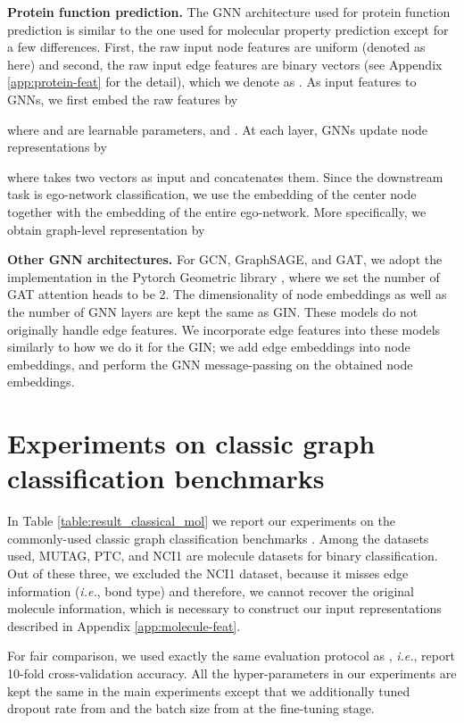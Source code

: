 \documentclass{article} \usepackage{iclr2020_conference,times}
\numberwithin{equation}{section}
\theoremstyle{plain}
\theoremstyle{definition}
\theoremstyle{remark}
\newcommand{\ie}{\textit{i.e.}}
\begin{document}
{\bf Protein function prediction.}
The GNN architecture used for protein function prediction is similar to the one used for molecular property prediction except for a few differences.
First, the raw input node features are uniform (denoted as  here) and second, the raw input edge features are binary vectors (see Appendix \ref{app:protein-feat} for the detail), which we denote as . As input features to GNNs, we first embed the raw features by 

where  and  are learnable parameters, and .
At each layer, GNNs update node representations by


where  takes two vectors as input and concatenates them. Since the downstream task is ego-network classification, we use the embedding of the center node  together with the embedding of the entire ego-network. More specifically, we obtain graph-level representation  by 

{\bf Other GNN architectures.}
For GCN, GraphSAGE, and GAT, we adopt the implementation in the Pytorch Geometric library \citep{fey2019fast}, where we set the number of GAT attention heads to be 2. The dimensionality of node embeddings as well as the number of GNN layers are kept the same as GIN.
These models do not originally handle edge features. 
We incorporate edge features into these models similarly to how we do it for the GIN; we add edge embeddings into node embeddings, and perform the GNN message-passing on the obtained node embeddings.


\section{Experiments on classic graph classification benchmarks}
\label{sec:classical_benchmarks}

In Table \ref{table:result_classical_mol} we report our experiments on the commonly-used classic graph classification benchmarks \citep{kersting2016benchmark}. Among the datasets \citet{xu2018how} used, MUTAG, PTC, and NCI1 are molecule datasets for binary classification.
Out of these three, we excluded the NCI1 dataset, because it misses edge information (\ie, bond type) and therefore, we cannot recover the original molecule information, which is necessary to construct our input representations described in Appendix \ref{app:molecule-feat}.

For fair comparison, we used exactly the same evaluation protocol as \citet{xu2018how}, \ie, report 10-fold cross-validation accuracy. All the hyper-parameters in our experiments are kept the same in the main experiments except that we additionally tuned dropout rate from  and the batch size from  at the fine-tuning stage.
\end{document}

